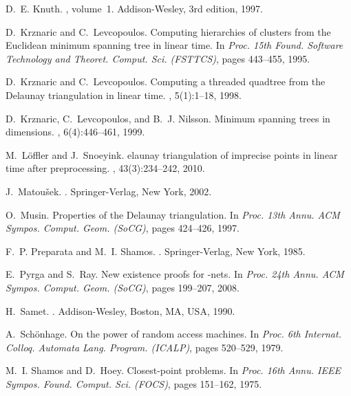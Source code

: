 \documentclass[11pt]{paper}
\begin{document}
\begin{thebibliography}{10}
D.~E. Knuth.
,
  volume~1.
\newblock Addison-Wesley, 3rd edition, 1997.

D.~Krznaric and C.~Levcopoulos.
\newblock Computing hierarchies of clusters from the {E}uclidean minimum
  spanning tree in linear time.
\newblock In {\em Proc. 15th Found. Software Technology and Theoret. Comput.
  Sci. (FSTTCS)}, pages 443--455, 1995.

D.~Krznaric and C.~Levcopoulos.
\newblock Computing a threaded quadtree from the {D}elaunay triangulation in
  linear time.
, 5(1):1--18, 1998.

D.~Krznaric, C.~Levcopoulos, and B.~J. Nilsson.
\newblock Minimum spanning trees in  dimensions.
, 6(4):446--461, 1999.

M.~L{\"o}ffler and J.~Snoeyink.
elaunay triangulation of imprecise points in linear time after
  preprocessing.
, 43(3):234--242, 2010.

J.~Matou{\v{s}}ek.
.
\newblock Springer-Verlag, New York, 2002.

O.~Musin.
\newblock Properties of the {Delaunay} triangulation.
\newblock In {\em Proc. 13th Annu. ACM Sympos. Comput. Geom. (SoCG)}, pages
  424--426, 1997.

F.~P. Preparata and M.~I. Shamos.
.
\newblock Springer-Verlag, New York, 1985.

E.~Pyrga and S.~Ray.
\newblock New existence proofs for {}-nets.
\newblock In {\em Proc. 24th Annu. ACM Sympos. Comput. Geom. (SoCG)}, pages
  199--207, 2008.

H.~Samet.
.
\newblock Addison-Wesley, Boston, MA, USA, 1990.

A.~Sch{\"o}nhage.
\newblock On the power of random access machines.
\newblock In {\em Proc. 6th Internat. Colloq. Automata Lang. Program. (ICALP)},
  pages 520--529, 1979.

M.~I. Shamos and D.~Hoey.
\newblock Closest-point problems.
\newblock In {\em Proc. 16th Annu. IEEE Sympos. Found. Comput. Sci. (FOCS)},
  pages 151--162, 1975.


\end{thebibliography}
\end{document}
